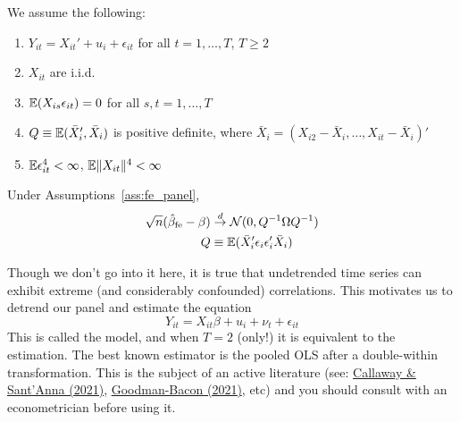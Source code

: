 \documentclass[10pt]{article}
\begin{document}
\begin{remark}
	\begin{assumption}\label{ass:fe_panel}
		We assume the following:
		\begin{enumerate}
			\item $Y_{it} = X_{it}' + u_i + \epsilon_{it}$ for all $t = 1,\dots,T$, $T \ge 2$
			\item $X_{it}$ are i.i.d.
			\item $\mathbb{E}(X_{is}\epsilon_{it}) = 0$ for all $s,t = 1,\dots,T$
			\item $Q \equiv \mathbb{E}(\bar{X}_i',\bar{X}_i)$ is positive definite, where $\bar{X}_i = (X_{i2} - \bar{X}_i,\dots,X_{it} - \bar{X}_i)'$
			\item $\mathbb{E}\epsilon_{it}^4 < \infty$, $\mathbb{E} \|X_{it}\|^4 < \infty$
		\end{enumerate}
	\end{assumption}
	\begin{theorem}
		Under Assumptions~\ref{ass:fe_panel}, \begin{align*} \sqrt{n}(\hat{\beta}_{\textnormal{fe}} - \beta) &\overset{d}{\to} \mathcal{N}(0,Q^{-1}\Omega Q^{-1}) \\Q &\equiv \mathbb{E}(\bar{X}_i' \epsilon_i\epsilon_i' \bar{X}_i)\end{align*}
	\end{theorem}
\end{remark}

\begin{remark}
	Though we don't go into it here, it is true that undetrended time series can exhibit extreme (and considerably confounded) correlations. This motivates us to detrend our panel and estimate the equation \[Y_{it} = X_{it} \beta + u_i + \nu_t + \epsilon_{it}\]This is called the  model, and when $T = 2$ (only!) it is equivalent to the  estimation. The best known estimator is the pooled OLS after a double-within transformation. This is the subject of an active literature (see: \href{https://www.sciencedirect.com/science/article/pii/S0304407620303948}{Callaway \& Sant'Anna (2021)}, \href{https://file-lianxh.oss-cn-shenzhen.aliyuncs.com/Refs/XuDID/Goodman-Bacon-2021-JoE.pdf}{Goodman-Bacon (2021)}, etc) and you should consult with an econometrician before using it.
\end{remark}
\end{document}
